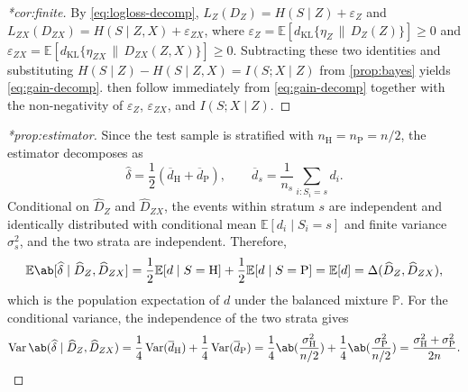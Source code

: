 \documentclass[12pt]{article}
\newcommand{\Herwig}{\mathrm{H}}
\newcommand{\Pythia}{\mathrm{P}}
\newcommand{\E}{\mathbb{E}}
\newcommand{\Prb}{\mathbb{P}}
\newcommand{\kl}{d_{\mathrm{KL}}}
\newcommand{\1}{\mathbbm{1}}
\renewcommand{\[}{\begin{equation}}
\renewcommand{\]}{\end{equation}}
\begin{document}
\begin{proof}[*cor:finite]
        By \cref{eq:logloss-decomp}, \(L_Z(D_Z) = H(S \mid Z) + \varepsilon_Z\) and \(L_{ZX}(D_{ZX}) = H(S \mid Z, X) + \varepsilon_{ZX}\), where \(\varepsilon_Z = \E[\kl\{\eta_Z \,\|\, D_Z(Z)\}] \ge 0\) and \(\varepsilon_{ZX} = \E[\kl\{\eta_{ZX} \,\|\, D_{ZX}(Z, X)\}] \ge 0\).
        Subtracting these two identities and substituting \(H(S \mid Z) - H(S \mid Z, X) = I(S; X \mid Z)\) from \cref{prop:bayes} yields \cref{eq:gain-decomp}.
         then follow immediately from \cref{eq:gain-decomp} together with the non-negativity of \(\varepsilon_Z\), \(\varepsilon_{ZX}\), and \(I(S; X \mid Z)\).
    \end{proof}

\begin{proof}[*prop:estimator]
        Since the test sample is stratified with \(n_\Herwig= n_\Pythia = n/2\), the estimator decomposes as
        \[
            \widehat\delta = \frac12 (\overline d_\Herwig + \overline d_\Pythia), \qquad \overline d_s = \frac1{n_s}\sum_{i \colon S_i = s}d_i.
        \]
        Conditional on \(\widehat D_Z\) and \(\widehat D_{ZX}\), the events within stratum \(s\) are independent and identically distributed with conditional mean \(\E[d_i \mid S_i=s]\) and finite variance \(\sigma_s^2\), and the two strata are independent.
        Therefore,
        \[
            \E\ab[\widehat\delta \mid \widehat D_Z, \widehat D_{ZX}] = \frac12\E[d \mid S=\Herwig] + \frac12 \E[d \mid S=\Pythia] = \E[d] = \Delta(\widehat D_Z,\widehat D_{ZX}),
        \]
        which is the population expectation of \(d\) under the balanced mixture \(\Prb\).
        For the conditional variance, the independence of the two strata gives
        \[
            \operatorname{Var}\ab(\widehat\delta \mid \widehat D_Z, \widehat D_{ZX}) = \frac14 \operatorname{Var}(\overline d_\Herwig) + \frac14 \operatorname{Var}(\overline d_\Pythia) = \frac14 \ab( \frac{\sigma_\Herwig^2}{n/2} ) + \frac14 \ab( \frac{\sigma_\Pythia^2}{n/2} ) = \frac{\sigma_\Herwig^2 + \sigma_\Pythia^2}{2n}.
        \]
    \end{proof}
\end{document}
